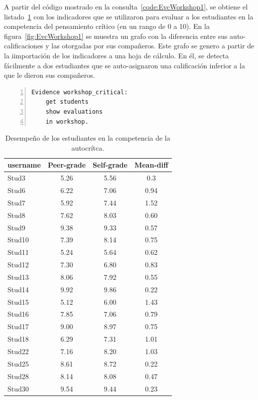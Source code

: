 A partir del código mostrado en la consulta~\ref{code:EvcWorkshop1}, se obtiene el listado~\ref{tab:EvcWorkshop1} con los indicadores que se utilizaron para evaluar a los estudiantes en la competencia del pensamiento crítico (en un rango de 0 a 10). En la figura~\ref{fig:EvcWorkshop1} se muestra un grafo con la diferencia entre sus auto-calificaciones y las otorgadas por sus compañeros. Este grafo se genero a partir de la iimportación de los indicadores a una hoja de cálculo. En él, se detecta fácilmente a dos estudiantes que se auto-asignaron una calificación inferior a la que le dieron sus compañeros.

\begin{lstlisting}[caption=Extracción evaluaciones realizadas en los talleres ,label=code:EvcWorkshop1,numbers=left, captionpos=b, morekeywords={Evidence,get, students, show, milestones, evaluations, participation, access, in, assignment, forum, campus, between, and, workshop, interaction}]
Evidence workshop_critical: 
	get students
	show evaluations
	in workshop.
\end{lstlisting}

\begin{table}
	\centering
	\caption{Desempeño de los estudiantes en la competencia de la autocrítca.}
	\label{tab:EvcWorkshop1}
	\begin{tabular}{|l|c|c|c|}
		\hline
		username & Peer-grade & Self-grade & Mean-diff \\
		\hline
		\hline
			Stud3 & 5.26 & 5.56 & 0.3 \\
			Stud6 & 6.22 & 7.06 & 0.94 \\
			Stud7 & 5.92 & 7.44 & 1.52 \\
			Stud8 & 7.62 & 8.03 & 0.60 \\
			Stud9 & 9.38 & 9.33 & 0.57 \\
			Stud10 & 7.39 & 8.14 & 0.75 \\
			Stud11 & 5.24 & 5.64 & 0.62 \\
			Stud12 & 7.30 & 6.80 & 0.83 \\
			Stud13 & 8.06 & 7.92 & 0.55 \\
			Stud14 & 9.92 & 9.86 & 0.22 \\
			Stud15 & 5.12 & 6.00 & 1.43 \\
			Stud16 & 7.85 & 7.06 & 0.79 \\
			Stud17 & 9.00 & 8.97 & 0.75 \\
			Stud18 & 6.29 & 7.31 & 1.01 \\
			Stud22 & 7.16 & 8.20 & 1.03 \\
			Stud25 & 8.61 & 8.72 & 0.22 \\
			Stud28 & 8.14 & 8.08 & 0.47 \\
			Stud30 & 9.54 & 9.44 & 0.23 \\
		\hline
	\end{tabular}
\end{table}

